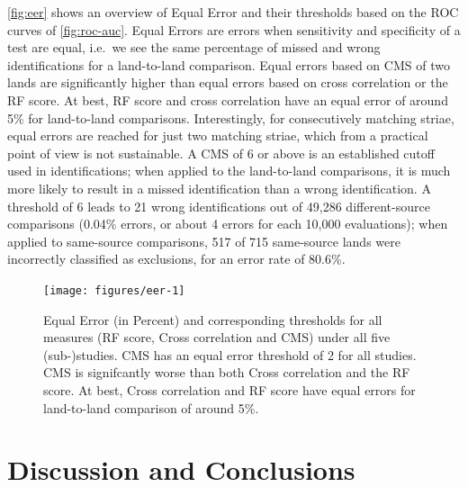 \documentclass[doubleblind]{elsarticle}\usepackage[]{graphicx}\usepackage[]{color}
\newenvironment{knitrout}{}{} %
\begin{document}
\autoref{fig:eer} shows an overview of Equal Error and their thresholds based on the ROC curves of \autoref{fig:roc-auc}. Equal Errors are errors when sensitivity and specificity of a test are equal, i.e.\ we see the same percentage of missed and wrong identifications for a land-to-land comparison. Equal errors based on CMS of two lands are significantly higher than equal errors based on cross correlation or the RF score. At best, RF score and cross correlation have an equal error of around 5\% for land-to-land comparisons. 
Interestingly, for consecutively matching striae, equal errors are reached for just two matching striae, which from a practical point of view is not sustainable. A  CMS of  6 or above is an established cutoff used in identifications; when applied to the land-to-land comparisons, it is much more likely to result in a missed identification than a wrong identification. A threshold of 6 leads to 21 wrong identifications out of 49,286 different-source comparisons (0.04\% errors, or about 4 errors for each 10,000 evaluations); when applied to same-source comparisons, 517 of 715 same-source lands were incorrectly classified as exclusions, for an error rate of 80.6\%. 



\begin{knitrout}
\color{fgcolor}\begin{figure}

{\centering \texttt{[image: figures/eer-1]} 

}

\caption[Equal Error (in Percent)  and corresponding thresholds for all measures (RF score, Cross correlation and CMS) under all five (sub-)studies]{Equal Error (in Percent)  and corresponding thresholds for all measures (RF score, Cross correlation and CMS) under all five (sub-)studies. CMS has an equal error threshold of 2 for all studies. CMS is signifcantly worse than both Cross correlation and the RF score. At best, Cross correlation and RF score have equal errors for land-to-land comparison of around 5\%.}\label{fig:eer}
\end{figure}


\end{knitrout}


\section{Discussion and Conclusions}
\end{document}
